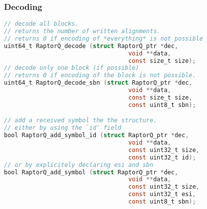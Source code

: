 \documentclass[11pt,a4paper]{refart}
\begin{document}
\subsubsection{Decoding}
\begin{lstlisting}[language=C]
// decode all blocks.
// returns the number of written alignments.
// returns 0 if encoding of *everything* is not possible
uint64_t RaptorQ_decode (struct RaptorQ_ptr *dec,
                                   void **data,
                                   const size_t size);
// decode only one block (if possible)
// returns 0 if encoding of the block is not possible.
uint64_t RaptorQ_decode_sbn (struct RaptorQ_ptr *dec,
                                   void **data,
                                   const size_t size,
                                   const uint8_t sbn);

// add a received symbol the the structure.
// either by using the `id' field
bool RaptorQ_add_symbol_id (struct RaptorQ_ptr *dec,
                                   void **data,
                                   const uint32_t size,
                                   const uint32_t id);
// or by explicitely declaring esi and sbn
bool RaptorQ_add_symbol (struct RaptorQ_ptr *dec,
                                   void **data,
                                   const uint32_t size,
                                   const uint32_t esi,
                                   const uint8_t sbn);
\end{lstlisting}





\printindex
\end{document}
